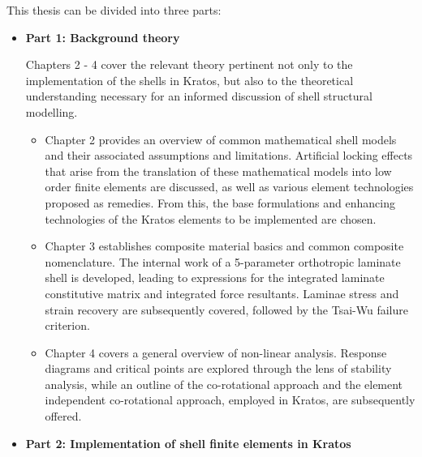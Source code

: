 \newpage
This thesis can be divided into three parts:
\begin{itemize}
	\item \textbf{Part 1: Background theory}
	
	Chapters 2 - 4 cover the relevant theory pertinent not only to the implementation of the shells in Kratos, but also to the theoretical understanding necessary for an informed discussion of shell structural modelling.
	\begin{itemize}
		\item Chapter 2 provides an overview of common mathematical shell models and their associated assumptions and limitations. Artificial locking effects that arise from the translation of these mathematical models into low order finite elements are discussed, as well as various element technologies proposed as remedies. From this, the base formulations and enhancing technologies of the Kratos elements to be implemented are chosen.
		\item Chapter 3 establishes composite material basics and common composite nomenclature. The internal work of a 5-parameter orthotropic laminate shell is developed, leading to expressions for the integrated laminate constitutive matrix and integrated force resultants. Laminae stress and strain recovery are subsequently covered, followed by the Tsai-Wu failure criterion.
		\item Chapter 4 covers a general overview of non-linear analysis. Response diagrams and critical points are explored through the lens of stability analysis, while an outline of the co-rotational approach and the element independent co-rotational approach, employed in Kratos, are subsequently offered.
	\end{itemize}


	\item \textbf{Part 2: Implementation of shell finite elements in Kratos}
	

\end{itemize}
